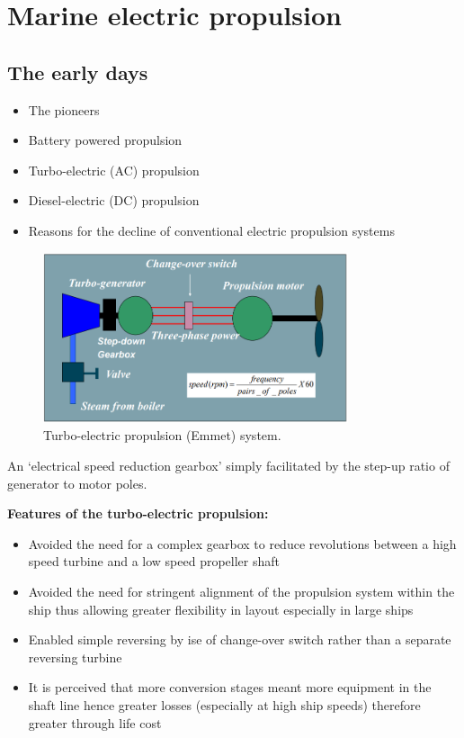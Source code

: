 \section{Marine electric propulsion}
\subsection{The early days}
\begin{itemize}
    \item The pioneers
    \item Battery powered propulsion
    \item Turbo-electric (AC) propulsion
    \item Diesel-electric (DC) propulsion
    \item Reasons for the decline of conventional electric propulsion systems
\end{itemize}

\begin{figure}[H]
    \centering
    \includegraphics[width = 0.8\textwidth]{img/figure56.png}
    \caption{Turbo-electric propulsion (Emmet) system.}
\end{figure}
An `electrical speed reduction gearbox' simply facilitated by the step-up ratio of generator to motor poles.

\textbf{Features of the turbo-electric propulsion:}
\begin{itemize}
    \item Avoided the need for a complex gearbox to reduce revolutions between a high speed turbine and a low speed propeller shaft
    \item Avoided the need for stringent alignment of the propulsion system within the ship thus allowing greater flexibility in layout especially in large ships
    \item Enabled simple reversing by ise of change-over switch rather than a separate reversing turbine
    \item It is perceived that more conversion stages meant more equipment in the shaft line hence greater losses (especially at high ship speeds) therefore greater through life cost
\end{itemize}

